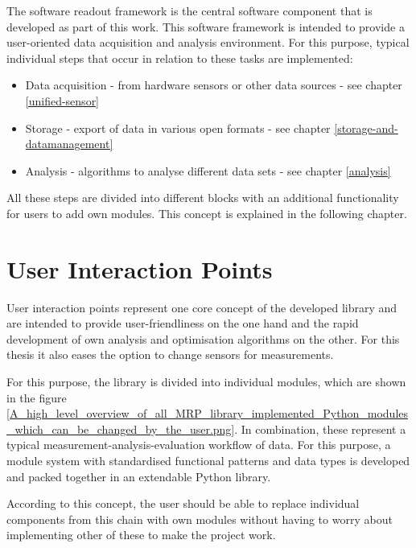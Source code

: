 The software readout framework is the central software component that is
developed as part of this work. This software framework is intended to
provide a user-oriented data acquisition and analysis environment. For
this purpose, typical individual steps that occur in relation to these
tasks are implemented:

\begin{itemize}
\tightlist
\item
  Data acquisition - from hardware sensors or other data sources - see
  chapter \ref{unified-sensor}
\item
  Storage - export of data in various open formats - see chapter
  \ref{storage-and-datamanagement}
\item
  Analysis - algorithms to analyse different data sets - see chapter
  \ref{analysis}
\end{itemize}

All these steps are divided into different blocks with an additional
functionality for users to add own modules. This concept is explained in
the following chapter.

\hypertarget{user-interaction-points}{%
\section{User Interaction Points}\label{user-interaction-points}}

User interaction points represent one core concept of the developed
library and are intended to provide user-friendliness on the one hand
and the rapid development of own analysis and optimisation algorithms on
the other. For this thesis it also eases the option to change sensors
for measurements.

For this purpose, the library is divided into individual modules, which
are shown in the figure
\ref{A_high_level_overview_of_all_MRP_library_implemented_Python_modules_which_can_be_changed_by_the_user.png}.
In combination, these represent a typical
measurement-analysis-evaluation workflow of data. For this purpose, a
module system with standardised functional patterns and data types is
developed and packed together in an extendable Python library.

\newpage

According to this concept, the user should be able to replace individual
components from this chain with own modules without having to worry
about implementing other of these to make the project work.


